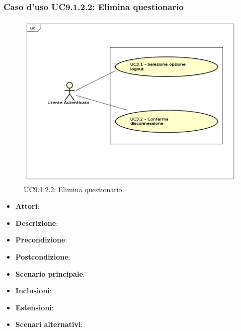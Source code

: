 			\subsubsection{Caso d'uso UC9.1.2.2: Elimina questionario}
			\label{UC9.1.2.2}
			\begin{figure}[h]
				\centering
			\includegraphics[scale=0.7,keepaspectratio]{UML/UC9.png}
				\caption{UC9.1.2.2: Elimina questionario}
			\end{figure}
			\FloatBarrier
			\begin{itemize}
				\item \textbf{Attori}: 
				\item \textbf{Descrizione}: 
				\item \textbf{Precondizione}: 
				\item \textbf{Postcondizione}: 
				\item \textbf{Scenario principale}:
				\item \textbf{Inclusioni}:
				\item \textbf{Estensioni}:
				\item \textbf{Scenari alternativi}:
			\end{itemize}
			
